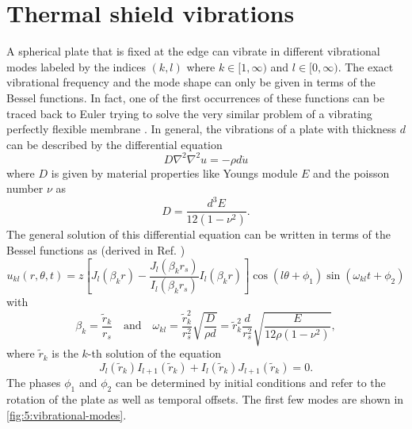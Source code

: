 \section{Thermal shield vibrations}\label{sec:5:thermal-vibrations}
A spherical plate that is fixed at the edge can vibrate in different vibrational modes labeled by the indices $(k,l)$ where $k \in [1,\infty)$ and $l \in [0, \infty)$.
The exact vibrational frequency and the mode shape can only be given in terms of the Bessel functions. In fact, one of the first occurrences of these functions can be traced back to Euler trying to solve the very similar problem of a vibrating perfectly flexible membrane \cite{Dutka_1995}.
In general, the vibrations of a plate with thickness $d$ can be described by the differential equation \cite[p. 490]{Rao_2019}
\begin{equation}
  D \nabla^2\nabla^2 u = -\rho d \ddot{u}
\end{equation} 
where $D$ is given by material properties like Youngs module $E$ and the poisson number $\nu$ as
\begin{equation}
  D = \frac{d^3 E}{12(1-\nu^2)} .
\end{equation}
The general solution of this differential equation can be written in terms of the Bessel functions as (derived in Ref. \cite[p. 490-495]{Rao_2019}) 
\begin{equation}
  u_{kl}(r, \theta, t) = z\left[J_l(\beta_k r) - \frac{J_l(\beta_k r_s)}{I_l(\beta_k r_s)}I_l(\beta_k r)\right]\cos(l\theta+\phi_1)\sin(\omega_{kl}t+\phi_2)
\end{equation}
with
\begin{equation}
  \beta_k = \frac{\tilde{r}_k}{r_s} \quad \text{and} \quad \omega_{kl} = \frac{\tilde{r}_k^2}{r_s^2}\sqrt{\frac{D}{\rho d}} = \tilde{r}_k^2\frac{d}{r_s^2}\sqrt{\frac{E}{12\rho(1-\nu^2)}} ,
\end{equation}
where $\tilde{r}_k$ is the $k$-th solution of the equation
\begin{equation}
  J_l(\tilde{r}_k)I_{l+1}(\tilde{r}_k)+I_l(\tilde{r}_k)J_{l+1}(\tilde{r}_k) = 0 .
\end{equation}
The phases $\phi_1$ and $\phi_2$ can be determined by initial conditions and refer to the rotation of the plate as well as temporal offsets. The first few modes are shown in \cref{fig:5:vibrational-modes}.
